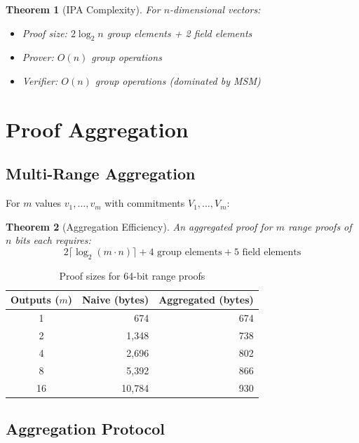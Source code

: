 \documentclass[11pt,a4paper]{article}
\newtheorem{theorem}{Theorem}[section]
\begin{document}
\begin{theorem}[IPA Complexity]
For $n$-dimensional vectors:
\begin{itemize}
    \item Proof size: $2 \log_2 n$ group elements + 2 field elements
    \item Prover: $O(n)$ group operations
    \item Verifier: $O(n)$ group operations (dominated by MSM)
\end{itemize}
\end{theorem}

\section{Proof Aggregation}
\label{sec:aggregation}

\subsection{Multi-Range Aggregation}

For $m$ values $v_1, \ldots, v_m$ with commitments $V_1, \ldots, V_m$:

\begin{theorem}[Aggregation Efficiency]
An aggregated proof for $m$ range proofs of $n$ bits each requires:
\[
2 \lceil \log_2(m \cdot n) \rceil + 4 \text{ group elements} + 5 \text{ field elements}
\]
\end{theorem}

\begin{table}[h]
\centering
\begin{tabular}{crr}
\toprule
\textbf{Outputs ($m$)} & \textbf{Naive (bytes)} & \textbf{Aggregated (bytes)} \\
\midrule
1 & 674 & 674 \\
2 & 1,348 & 738 \\
4 & 2,696 & 802 \\
8 & 5,392 & 866 \\
16 & 10,784 & 930 \\
\bottomrule
\end{tabular}
\caption{Proof sizes for 64-bit range proofs}
\label{tab:aggregation}
\end{table}

\subsection{Aggregation Protocol}
\end{document}
